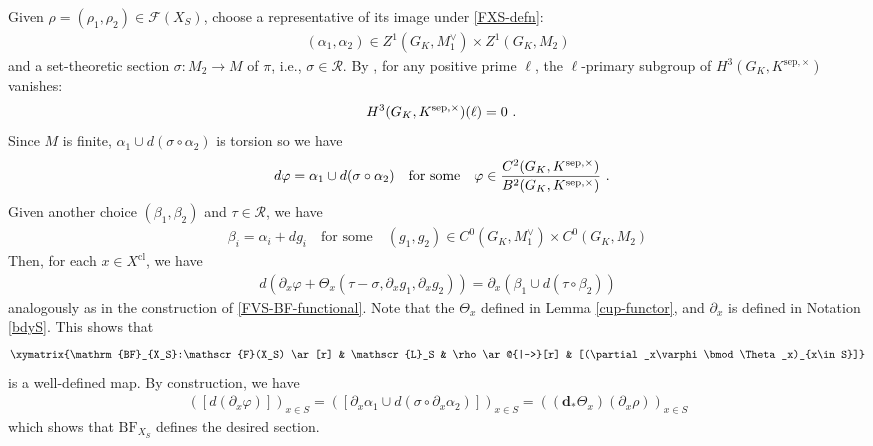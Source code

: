 \documentclass[a4paper]{amsart}
\theoremstyle{definition}
\numberwithin{equation}{section}
\begin{document}
Given $\rho=(\rho_1,\rho_2)\in\mathscr{F}(X_S)$, choose a representative of its image under \eqref{FXS-defn}:
\begin{align*}
    (\alpha_1,\alpha_2)\in Z^1(G_K,M_1^\vee)\times Z^1(G_K,M_2)
\end{align*}
and a set-theoretic section $\sigma:M_2\rightarrow M$ of $\pi$, i.e., $\sigma\in\mathscr{R}$. By \cite[Corollary I.4.18]{Mil06}, for any positive prime $\ell$, the $\ell$-primary subgroup of $H^3(G_K,K^{\mathrm{sep},\times})$ vanishes:
\begin{align*}
    H^3(G_K,K^{\mathrm{sep},\times})(\ell)=0\rlap{\ .}
\end{align*}
Since $M$ is finite, $\alpha_1\cup d(\sigma\circ\alpha_2)$ is torsion so we have
\begin{align*}
    d\varphi=\alpha_1\cup d(\sigma\circ\alpha_2)\quad\textrm{for some}\quad\varphi\in\frac{C^2(G_K,K^{\mathrm{sep},\times})}{B^2(G_K,K^{\mathrm{sep},\times})}\rlap{\ .}
\end{align*}
Given another choice $(\beta_1,\beta_2)$ and $\tau\in\mathscr{R}$, we have
\begin{align*}
    \beta_i=\alpha_i+dg_i\quad\textrm{for some}\quad(g_1,g_2)\in C^0(G_K,M_1^\vee)\times C^0(G_K,M_2)
\end{align*}
Then, for each $x\in X^\mathrm{cl}$, we have
\begin{align*}
    d(\partial_x\varphi+\Theta_x(\tau-\sigma,\partial_xg_1,\partial_xg_2))=\partial_x(\beta_1\cup d(\tau\circ\beta_2))
\end{align*}
analogously as in the construction of \eqref{FVS-BF-functional}. Note that the $\Theta_x$ defined in Lemma \ref{cup-functor}, and $\partial_x$ is defined in Notation \ref{bdyS}. This shows that
\begin{align}\label{FUS-BF-functional}
    \xymatrix{\mathrm{BF}_{X_S}:\mathscr{F}(X_S) \ar[r] & \mathscr{L}_S & \rho \ar@{|->}[r] & [(\partial_x\varphi\bmod\Theta_x)_{x\in S}]}
\end{align}
is a well-defined map. By construction, we have
\begin{align*}
    ([d(\partial_x\varphi)])_{x\in S}=([\partial_x\alpha_1\cup d(\sigma\circ\partial_x\alpha_2)])_{x\in S}=((\mathbf{d}_\ast\Theta_x)(\partial_x\rho))_{x\in S}
\end{align*}
which shows that $\mathrm{BF}_{X_S}$ defines the desired section.
\end{document}
